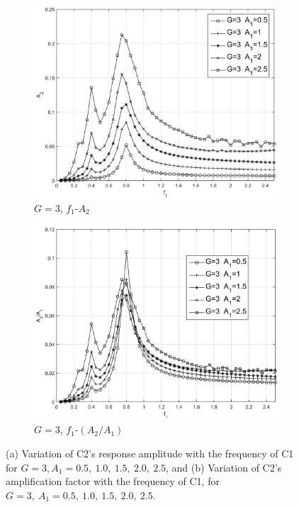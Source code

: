 \begin{figure}[tbp]	
	\newcommand\widthp{0.5}
	\centering
	\hspace*{\fill}%
	\begin{subfigure}[t]{\widthp\textwidth}
		\centering
		\includegraphics[width=\linewidth]{Figs/G=3_A2}
		\caption{$ G=3 $, $ f_1$-$A_2 $}
		\label{fig:g3a2}
	\end{subfigure}%
	\begin{subfigure}[t]{\widthp\textwidth}
		\centering
		\includegraphics[width=\linewidth]{Figs/G=3_A2dA1}
		\caption{$ G=3 $, $ f_1$-$(A_2/A_1)$}
		\label{fig:g3a2da1}
	\end{subfigure}%
	\caption{
		(a) Variation of C2's response amplitude with the frequency of C1 for $ G=3, A_1=0.5,\ 1.0,\ 1.5,\ 2.0,\ 2.5 $, and (b) Variation of C2's amplification factor with the frequency of C1, for $ G=3,\ A_1=0.5,\ 1.0,\ 1.5,\ 2.0,\ 2.5 $.
	}
	\label{fig:g3}
\end{figure}

